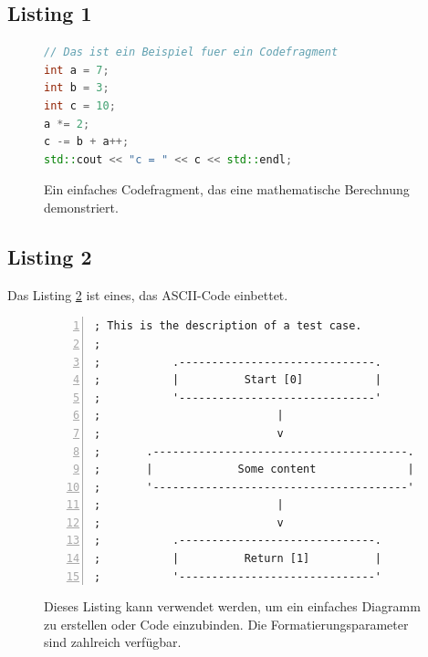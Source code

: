 \subsection{Listing 1}
\label{subsec:Listing1}

\FloatBarrier
\begin{figure}[htb]
\begin{lstlisting}[language=C++, breaklines=true, basicstyle=\small, numbers=none]
// Das ist ein Beispiel fuer ein Codefragment
int a = 7;
int b = 3;
int c = 10;
a *= 2;
c -= b + a++;
std::cout << "c = " << c << std::endl;
\end{lstlisting}
  \caption[Beispiel eines einfachen Codefragments.]{Ein einfaches Codefragment, das eine mathematische Berechnung demonstriert.}
\label{lst:Codefragment}
\end{figure}


\subsection{Listing 2}
\label{subsec:Listing 2}

Das Listing \ref{lst:Diagramm} ist eines, das ASCII-Code einbettet.

\FloatBarrier
\begin{figure}[htb]
\begin{lstlisting}[backgroundcolor={\color{white}},
basicstyle={\normalsize\sffamily},
breaklines=true,
frame={bottomline,topline, rightline},
language=HTML,
numbers=left,
showstringspaces=false,
xleftmargin=22pt]	
; This is the description of a test case.
;
;           .------------------------------.
;           |          Start [0]           |
;           '------------------------------'
;                           |
;                           v
;       .---------------------------------------.
;       |             Some content		        |
;       '---------------------------------------'
;                           |
;                           v
;           .------------------------------.
;           |          Return [1]          |
;           '------------------------------'
\end{lstlisting}
  \caption[Ein Listing mit ASCII-Code und Zeilennummern]{Dieses Listing kann verwendet werden, um ein einfaches Diagramm zu erstellen oder Code einzubinden. Die Formatierungsparameter sind zahlreich verfügbar.}
\label{lst:Diagramm}
\end{figure}





